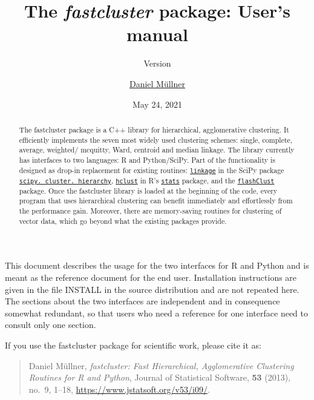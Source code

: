 \documentclass[fontsize=10pt,paper=letter,BCOR=-6mm,DIV=8]{scrartcl}
\newcommand*\linkage{\href{https://docs.scipy.org/doc/scipy/reference/generated/scipy.cluster.hierarchy.linkage.html}{\texttt{linkage}}}
\newcommand*\hierarchy{\href{https://docs.scipy.org/doc/scipy/reference/generated/scipy.cluster.hierarchy.linkage.html}{\texttt{scipy.\hskip0pt cluster.\hskip0pt hierarchy}}}
\newcommand*\hclust{\href{https://stat.ethz.ch/R-manual/R-patched/library/stats/html/hclust.html}{\texttt{hclust}}}
\newcommand*\stats{\href{https://stat.ethz.ch/R-manual/R-patched/library/stats/html/00Index.html}{\texttt{stats}}}
\newcommand*\flashClustPack{\href{https://CRAN.R-project.org/package=flashClust}{\texttt{flashClust}}}
\begin{document}
\title{The \textit{fastcluster} package: User's manual}
\author{\href{http://danifold.net}{Daniel Müllner}}
\date{May 24, 2021}
\subtitle{Version \fastclusterversion}
\maketitle

\makeatletter
\renewenvironment{quotation}{%
  \list{}{\listparindent 1em%
    \itemindent    \listparindent
    \leftmargin2.5em
    \rightmargin   \leftmargin
    \parsep        \z@ \@plus\p@
  }%
  \item\relax
}{%
  \endlist
}
\makeatother
\begin{abstract}\noindent\small
The fastcluster package is a C++ library for hierarchical, agglomerative
clustering. It efficiently implements the
seven most widely used clustering schemes: single, complete, average, weighted/\hskip0pt mcquitty, Ward, centroid and median linkage. The library currently has interfaces to two languages: R and Python/SciPy. Part of the functionality is designed as drop-in replacement for existing routines: \linkage{} in the SciPy package \hierarchy{}, \hclust{} in R's \stats{} package, and the \flashClustPack{} package. Once the fastcluster library is loaded at the beginning of the code, every program that uses hierarchical clustering can benefit immediately and effortlessly from the performance gain. Moreover, there are memory-saving routines for clustering of vector data, which go beyond what the existing packages provide.
\end{abstract}

\noindent
This document describes the usage for the two interfaces for R and Python and is meant as the reference document for the end user. Installation instructions are given in the file INSTALL in the source distribution and are not repeated here. The sections about the two interfaces are independent and in consequence somewhat redundant, so that users who need a reference for one interface need to consult only one section.

If you use the fastcluster package for scientific work, please cite it as:
\begin{quote}
Daniel Müllner, \textit{fastcluster: Fast Hierarchical, Agglomerative Clustering Routines for R and Python}, Journal of Statistical Software, \textbf{53} (2013), no.~9, 1--18, \url{https://www.jstatsoft.org/v53/i09/}.
\end{quote}
\end{document}
